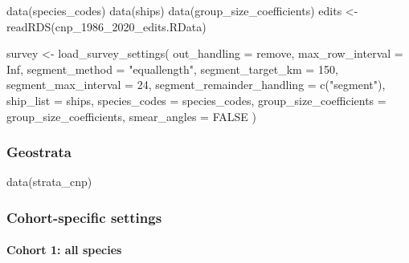 \documentclass[
]{book}
\newenvironment{Shaded}{\begin{snugshade}}{\end{snugshade}}
\newcommand{\AttributeTok}[1]{\textcolor[rgb]{0.77,0.63,0.00}{#1}}
\newcommand{\ConstantTok}[1]{\textcolor[rgb]{0.00,0.00,0.00}{#1}}
\newcommand{\DecValTok}[1]{\textcolor[rgb]{0.00,0.00,0.81}{#1}}
\newcommand{\FunctionTok}[1]{\textcolor[rgb]{0.00,0.00,0.00}{#1}}
\newcommand{\NormalTok}[1]{#1}
\newcommand{\OtherTok}[1]{\textcolor[rgb]{0.56,0.35,0.01}{#1}}
\newcommand{\StringTok}[1]{\textcolor[rgb]{0.31,0.60,0.02}{#1}}
\begin{document}
\begin{Shaded}
\begin{Highlighting}[]
\FunctionTok{data}\NormalTok{(species\_codes)}
\FunctionTok{data}\NormalTok{(ships)}
\FunctionTok{data}\NormalTok{(group\_size\_coefficients)}
\NormalTok{edits }\OtherTok{\textless{}{-}} \FunctionTok{readRDS}\NormalTok{(}\StringTok{\textquotesingle{}cnp\_1986\_2020\_edits.RData\textquotesingle{}}\NormalTok{)}

\NormalTok{survey }\OtherTok{\textless{}{-}} \FunctionTok{load\_survey\_settings}\NormalTok{(}
  \AttributeTok{out\_handling =} \StringTok{\textquotesingle{}remove\textquotesingle{}}\NormalTok{,}
  \AttributeTok{max\_row\_interval =} \ConstantTok{Inf}\NormalTok{,}
  \AttributeTok{segment\_method =} \StringTok{"equallength"}\NormalTok{,}
  \AttributeTok{segment\_target\_km =} \DecValTok{150}\NormalTok{,}
  \AttributeTok{segment\_max\_interval =} \DecValTok{24}\NormalTok{,}
  \AttributeTok{segment\_remainder\_handling =} \FunctionTok{c}\NormalTok{(}\StringTok{"segment"}\NormalTok{),}
  \AttributeTok{ship\_list =}\NormalTok{ ships,}
  \AttributeTok{species\_codes =}\NormalTok{ species\_codes,}
  \AttributeTok{group\_size\_coefficients =}\NormalTok{ group\_size\_coefficients,}
  \AttributeTok{smear\_angles =} \ConstantTok{FALSE}
\NormalTok{)}
\end{Highlighting}
\end{Shaded}

\hypertarget{geostrata-1}{%
\subsubsection*{Geostrata}\label{geostrata-1}}

\begin{Shaded}
\begin{Highlighting}[]
\FunctionTok{data}\NormalTok{(strata\_cnp)}
\end{Highlighting}
\end{Shaded}

\hypertarget{cohort-specific-settings-1}{%
\subsubsection*{Cohort-specific settings}\label{cohort-specific-settings-1}}

\hypertarget{cohort-1-all-species}{%
\paragraph*{Cohort 1: all species}\label{cohort-1-all-species}}
\end{document}
